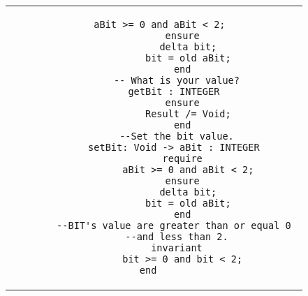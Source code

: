 \begin{center}
\begin{tabular}{ c  c }
\begin{minipage}[l]{6.4cm}
\begin{description}
\end{description}
\end{minipage}  
&
\begin{minipage}[l]{6.6cm}
\begin{lstlisting}[language=Bon]
          aBit >= 0 and aBit < 2;
        ensure
          delta bit;
          bit = old aBit;
        end
      -- What is your value?
      getBit : INTEGER 
        ensure
          Result /= Void;
        end
      --Set the bit value.
      setBit: Void -> aBit : INTEGER 
        require
          aBit >= 0 and aBit < 2;
        ensure
          delta bit;
          bit = old aBit;
        end
      --BIT's value are greater than or equal 0 
      --and less than 2.
      invariant
        bit >= 0 and bit < 2;
end    
\end{lstlisting}
\end{minipage}  
\end{tabular}
\end{center}
